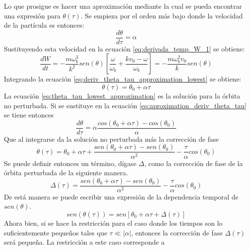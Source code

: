 Lo que prosigue es hacer una aproximación mediante la cual se pueda encontrar una expresión para $\theta(\tau)$. Se empieza por el orden más bajo donde la velocidad de la partícula es entonces:
\begin{equation}
\label{eq:deriv_theta_tau_approximation_lowest}
\frac{d\theta}{d\tau}=\alpha
\end{equation}
Sustituyendo esta velocidad en la ecuación \ref{eq:derivada_temp_W_1} se obtiene:
\begin{equation}
\label{eq:deriv_w_approximation_lowest}
\frac{dW}{dt}=-\frac{m\omega_b^3}{k^2}sen(\theta)\left[\frac{\omega}{\omega_b}+\frac{kv_0-\omega}{\omega_b}\right]=-\frac{m\omega_b^2v_0}{k}sen(\theta)
\end{equation}
Integrando la ecuación \ref{eq:deriv_theta_tau_approximation_lowest} se obtiene:
\begin{equation}
\label{eq:theta_tau_lowest_approximation}
\theta(\tau)=\theta_0 +\alpha \tau
\end{equation}
La ecuación \ref{eq:theta_tau_lowest_approximation} es la solución para la órbita no perturbada. Si se sustituye en la ecuación \ref{eq:aproximation_deriv_theta_tau} se tiene entonces
\begin{equation}
\label{eq:sust_deriv_theta_tau_approximation}
\frac{d\theta}{d\tau}=\alpha \frac{cos(\theta_0+\alpha \tau)-cos(\theta_0)}{\alpha}
\end{equation}
Que al integrarse da la solución no perturbada más la corrección de fase
\begin{equation}
\label{eq:theta_tau_first_correction}
\theta(\tau)=\theta_0 +\alpha\tau +\frac{sen(\theta_0 + \alpha\tau)-sen(\theta_0)}{\alpha^2}-\frac{\tau}{\alpha}cos(\theta_0)
\end{equation}
Se puede definir entonces un término, dígase $\Delta$, como la corrección de fase de la órbita perturbada de la siguiente manera.
\begin{equation}
\label{eq:perturbed_orbit_correction_phase}
\Delta (\tau)=\frac{sen(\theta_0 + \alpha\tau)-sen(\theta_0)}{\alpha^2}-\frac{\tau}{\alpha}cos(\theta_0)
\end{equation}
De está manera se puede escribir una expresión de la dependencia temporal de $sen(\theta)$.
\begin{equation}
\label{eq:sen_approximation_with_correction}
sen(\theta(\tau))=sen[\theta_0 + \alpha\tau + \Delta(\tau)]
\end{equation}
Ahora bien, si se hace la restricción para el caso donde los tiempos son lo suficientemente pequeños tales que $\tau \ll |\alpha|$, entonces la corrección de fase $\Delta(\tau)$ será pequeña. La restricción a este caso corresponde a 
